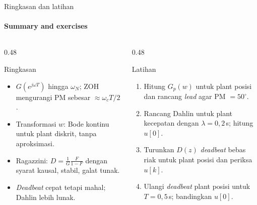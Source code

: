 \documentclass[aspectratio=169,10pt]{beamer}
\begin{document}
\begin{frame}{Ringkasan dan latihan}
	\framesubtitle{Summary and exercises}
	\begin{columns}[T]
		\begin{column}{0.48\textwidth}
			\begin{block}{Ringkasan}
				\small
				\begin{itemize}
					\item $G(e^{j\omega T})$ hingga $\omega_N$; ZOH mengurangi PM sebesar $\approx\omega_cT/2$.
					\item Transformasi $w$: Bode kontinu untuk plant diskrit, tanpa aproksimasi.
					\item Ragazzini: $D = \frac{1}{G}\frac{F}{1-F}$ dengan syarat kausal, stabil, galat tunak.
					\item \textit{Deadbeat} cepat tetapi mahal; Dahlin lebih lunak.
				\end{itemize}
			\end{block}
		\end{column}
		\begin{column}{0.48\textwidth}
			\begin{exampleblock}{Latihan}
				\small
				\begin{enumerate}
					\item Hitung $G_p(w)$ untuk plant posisi dan rancang \textit{lead} agar PM $=50^\circ$.
					\item Rancang Dahlin untuk plant kecepatan dengan $\lambda = 0{,}2$\,s; hitung $u[0]$.
					\item Turunkan $D(z)$ \textit{deadbeat} bebas riak untuk plant posisi dan periksa $u[k]$.
					\item Ulangi \textit{deadbeat} plant posisi untuk $T = 0{,}5$\,s; bandingkan $u[0]$.
				\end{enumerate}
			\end{exampleblock}
		\end{column}
	\end{columns}
\end{frame}
\end{document}
